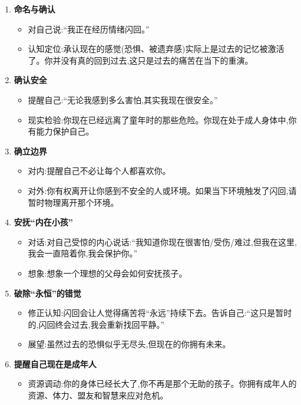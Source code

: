 \documentclass[11pt, a4paper]{article}
\begin{document}
\begin{enumerate}
    \item \textbf{命名与确认}
    \begin{itemize}
        \item 对自己说:“我正在经历情绪闪回。”
        \item 认知定位:承认现在的感觉(恐惧、被遗弃感)实际上是过去的记忆被激活了。你并没有真的回到过去,这只是过去的痛苦在当下的重演。
    \end{itemize}

    \item \textbf{确认安全}
    \begin{itemize}
        \item 提醒自己:“无论我感到多么害怕,其实我现在很安全。”
        \item 现实检验:你现在已经远离了童年时的那些危险。你现在处于成人身体中,你有能力保护自己。
    \end{itemize}

    \item \textbf{确立边界}
    \begin{itemize}
        \item 对内:提醒自己不必让每个人都喜欢你。
        \item 对外:你有权离开让你感到不安全的人或环境。如果当下环境触发了闪回,请暂时物理离开那个环境。
    \end{itemize}

    \item \textbf{安抚“内在小孩”}
    \begin{itemize}
        \item 对话:对自己受惊的内心说话:“我知道你现在很害怕/受伤/难过,但我在这里,我会一直陪着你,我会保护你。”
        \item 想象:想象一个理想的父母会如何安抚孩子。
    \end{itemize}

    \item \textbf{破除“永恒”的错觉}
    \begin{itemize}
        \item 修正认知:闪回会让人觉得痛苦将“永远”持续下去。告诉自己:“这只是暂时的,闪回终会过去,我会重新找回平静。”
        \item 展望:虽然过去的恐惧似乎无尽头,但现在的你拥有未来。
    \end{itemize}

    \item \textbf{提醒自己现在是成年人}
    \begin{itemize}
        \item 资源调动:你的身体已经长大了,你不再是那个无助的孩子。你拥有成年人的资源、体力、盟友和智慧来应对危机。
    \end{itemize}


\end{enumerate}
\end{document}
